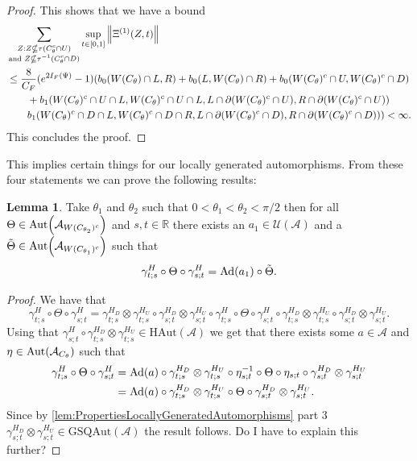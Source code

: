 \documentclass[12pt,a4paper,twoside]{article}
\let\originalleft\left
\let\originalright\right
\renewcommand{\left}{\mathopen{}\mathclose\bgroup\originalleft}
\renewcommand{\right}{\aftergroup\egroup\originalright}
\newcommand{\UU}{\mathcal U}
\renewcommand{\AA}{\mathcal A}
\newcommand{\RR}{\mathbb R}
\newcommand{\Ad}[1]{\textrm{Ad}\left(#1\right)}
\newcommand{\Aut}[1]{\textrm{Aut}\left(#1\right)}
\theoremstyle{definition}
\newtheorem{lemma}[theorem]{Lemma}
\numberwithin{equation}{section}
\begin{document}
\begin{proof}
	This shows that we have a bound
	\begin{align}
		&\sum_{\substack{Z:Z\nsubseteq \tau(C_\theta^c\cap U)\\\text{and }Z\nsubseteq \tau^{-1}(C_\theta^c\cap D)}}\sup_{t\in[0,1]}\norm{\Xi^{(1)}(Z,t)}\\
		\nonumber
		&\leq \frac{8}{C_F}(e^{2I_F(\Psi)}-1)(b_0(W(C_\theta)\cap L,R)+b_0(L,W(C_\theta)\cap R)+b_0(W(C_\theta)^c\cap U,W(C_\theta)^c\cap D)\\
		\nonumber
		&\qquad+b_1(W(C_\theta)^c\cap U\cap L,W(C_\theta)^c\cap U\cap L,L\cap\partial(W(C_\theta)^c\cap U),R\cap\partial(W(C_\theta)^c\cap U))\\
		&\qquad b_1(W(C_\theta)^c\cap D\cap L,W(C_\theta)^c\cap D\cap R,L\cap\partial(W(C_\theta)^c\cap D),R\cap\partial(W(C_\theta)^c\cap D)))<\infty.
	\end{align}
	This concludes the proof.
\end{proof}
This implies certain things for our locally generated automorphisms.
From these four statements we can prove the following results:
\begin{lemma}\label{lem:TwoAngleLemmaPart1}
	Take $\theta_1$ and $\theta_2$ such that $0<\theta_1<\theta_2<\pi/2$ then for all $\Theta\in\Aut{\AA_{W(C_{\theta_2})^c}}$ and $s,t\in\RR$ there exists an $a_1\in\UU(\AA)$ and a $\tilde{\Theta}\in \Aut{\AA_{W(C_{\theta_1})^c}}$ such that
		\begin{equation}\label{eq:TwoAngleLemmaPart1Equation1}
			\gamma^{H}_{t;s}\circ\Theta\circ\gamma^{H}_{s;t}=\Ad{a_1}\circ\tilde{\Theta}.
		\end{equation}
\end{lemma}
\begin{proof}
	We have that
	\begin{equation}
		\gamma^{H}_{t;s}\circ\Theta\circ\gamma^{H}_{s;t}=\gamma^{H_D}_{t;s}\otimes\gamma^{H_U}_{t;s}\circ\gamma^{H_D}_{s;t}\otimes\gamma^{H_U}_{s;t}\circ\gamma^{H}_{t;s}\circ\Theta\circ\gamma^{H}_{s;t}\circ\gamma^{H_D}_{t;s}\otimes\gamma^{H_U}_{t;s}\circ\gamma^{H_D}_{s;t}\otimes\gamma^{H_U}_{s;t}.
	\end{equation}
	Using that $\gamma^{H}_{s;t}\circ\gamma^{H_D}_{t;s}\otimes\gamma^{H_U}_{t;s}\in\textrm{HAut}(\AA)$ we get that there exists some $a\in\AA$ and $\eta\in\Aut{\AA_{C_\theta}}$ such that
	\begin{align}
		\gamma^{H}_{t;s}\circ\Theta\circ\gamma^{H}_{s;t}&=\Ad{a}\circ \gamma^{H_D}_{t;s}\otimes\gamma^{H_U}_{t;s}\circ\eta_{s;t}^{-1}\circ\Theta\circ\eta_{s;t}\circ\gamma^{H_D}_{s;t}\otimes\gamma^{H_U}_{s;t}\\
		&=\Ad{a}\circ \gamma^{H_D}_{t;s}\otimes\gamma^{H_U}_{t;s}\circ\Theta\circ\gamma^{H_D}_{s;t}\otimes\gamma^{H_U}_{s;t}.
	\end{align}
	Since by \ref{lem:PropertiesLocallyGeneratedAutomorphisms} part 3 $\gamma^{H_D}_{s;t}\otimes\gamma^{H_U}_{s;t}\in\textrm{GSQAut}(\AA)$ the result follows. {\color{red}Do I have to explain this further?}
\end{proof}
\end{document}
